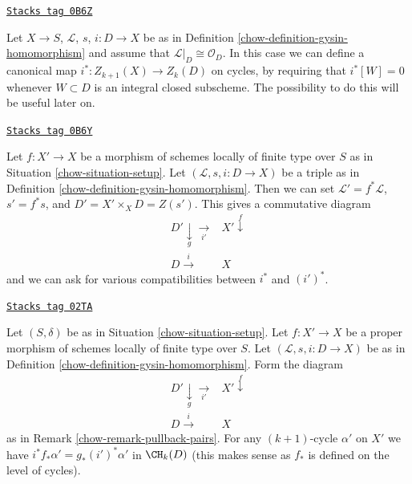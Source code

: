 \begin{remark}
\label{chow-remark-gysin-on-cycles}
\href{https://stacks.math.columbia.edu/tag/0B6Z}{\texttt{Stacks tag 0B6Z}}

Let $X \to S$, $\mathcal{L}$, $s$, $i : D \to X$ be as in
Definition \ref{chow-definition-gysin-homomorphism} and assume
that $\mathcal{L}|_D \cong \mathcal{O}_D$. In this case we
can define a canonical map $i^* : Z_{k + 1}(X) \to Z_k(D)$
on cycles, by requiring that $i^*[W] = 0$ whenever $W \subset D$
is an integral closed subscheme.
The possibility to do this will be useful later on.
\end{remark}

\begin{remark}
\label{chow-remark-pullback-pairs}
\href{https://stacks.math.columbia.edu/tag/0B6Y}{\texttt{Stacks tag 0B6Y}}

Let $f : X' \to X$ be a morphism of schemes locally of finite type over $S$
as in Situation \ref{chow-situation-setup}. Let $(\mathcal{L}, s, i : D \to X)$
be a triple as in Definition \ref{chow-definition-gysin-homomorphism}.
Then we can set $\mathcal{L}' = f^*\mathcal{L}$, $s' = f^*s$, and
$D' = X' \times_X D = Z(s')$. This gives a commutative diagram
$$
\begin{array}{cc}D' \underset{g}{\downarrow}\underset{i'}{\longrightarrow} & X' \overset{f}{\downarrow} \\ D \overset{i}{\longrightarrow} & X\end{array}
$$
and we can ask for various compatibilities between $i^*$ and $(i')^*$.
\end{remark}

\begin{lemma}
\label{chow-lemma-closed-in-X-gysin}
\href{https://stacks.math.columbia.edu/tag/02TA}{\texttt{Stacks tag 02TA}}

Let $(S, \delta)$ be as in Situation \ref{chow-situation-setup}.
Let $f : X' \to X$ be a proper morphism of schemes
locally of finite type over $S$.
Let $(\mathcal{L}, s, i : D \to X)$ be as in
Definition \ref{chow-definition-gysin-homomorphism}.
Form the diagram
$$
\begin{array}{cc}D' \underset{g}{\downarrow}\underset{i'}{\longrightarrow} & X' \overset{f}{\downarrow} \\ D \overset{i}{\longrightarrow} & X\end{array}
$$
as in Remark \ref{chow-remark-pullback-pairs}.
For any $(k + 1)$-cycle $\alpha'$ on $X'$ we have
$i^*f_*\alpha' = g_*(i')^*\alpha'$ in $\CH_k(D)$
(this makes sense as $f_*$ is defined on the level of cycles).
\end{lemma}

